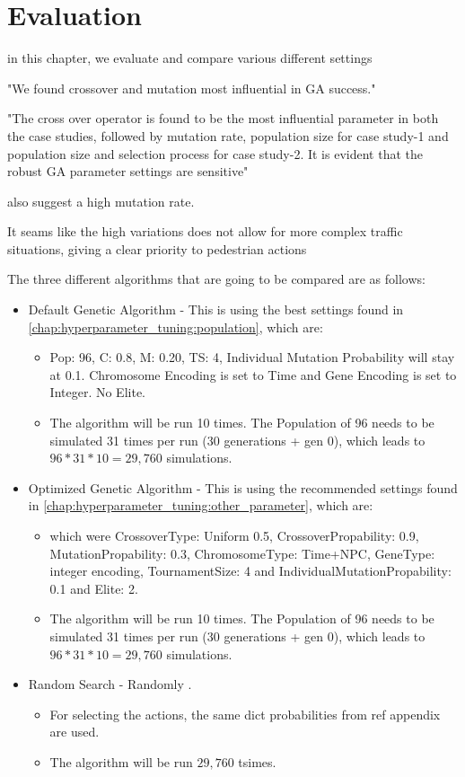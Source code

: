 \chapter{Evaluation}
\label{chap:evaluation}
in this chapter, we evaluate and compare various different settings

"We found crossover and mutation most influential in GA success."\cite{mills_determining_2015}

"The cross over operator is found to be the most influential parameter in both the case studies, followed by mutation rate, population size for case study-1 and population size and selection process for case study-2. It is evident that the robust GA parameter settings are sensitive"\cite{majumdar_genetic_2015}

\cite{boyabatli_parameter_2004} also suggest a high mutation rate.



It seams like the high variations does not allow for more complex traffic situations, giving a clear priority to pedestrian actions


The three different algorithms that are going to be compared are as follows:
\begin{itemize}
	\item Default Genetic Algorithm - This is using the best settings found in \ref{chap:hyperparameter_tuning:population}, which are:
	\begin{itemize}
		\item Pop: 96, C: 0.8, M: 0.20, TS: 4, Individual Mutation Probability will stay at 0.1. Chromosome Encoding is set to Time and Gene Encoding is set to Integer. No Elite. 
		\item The algorithm will be run 10 times. The Population of 96 needs to be simulated 31 times per run (30 generations + gen 0), which leads to $96 * 31 * 10 = 29,760$ simulations.
	\end{itemize}
	\item Optimized Genetic Algorithm - This is using the recommended settings found in \ref{chap:hyperparameter_tuning:other_parameter}, which are:
	\begin{itemize}
		\item 	which were CrossoverType: Uniform 0.5, CrossoverPropability: 0.9, MutationPropability: 0.3, ChromosomeType: Time+NPC, GeneType: integer encoding, TournamentSize: 4 and IndividualMutationPropability: 0.1 and Elite: 2. 
		\item The algorithm will be run 10 times. The Population of 96 needs to be simulated 31 times per run (30 generations + gen 0), which leads to $96 * 31 * 10 = 29,760$ simulations.
	\end{itemize}
	\item Random Search - Randomly .
	\begin{itemize}
		\item For selecting the actions, the same dict probabilities from ref appendix are used. 
		\item The algorithm will be run $29,760$ tsimes.
	\end{itemize}
\end{itemize}

